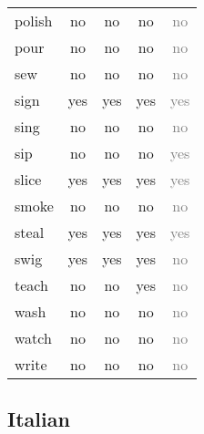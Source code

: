 \begin{longtable}{lc|ccc}
polish    & no       & no     & no          & 	\textcolor{gray}{no}          \\
pour      & no       & no     & no          & 	\textcolor{gray}{no}          \\
sew       & no       & no     & no          & 	\textcolor{gray}{no}          \\
sign      & yes      & yes    & yes         & 	\textcolor{gray}{yes}         \\
sing      & no       & no     & no          & 	\textcolor{gray}{no}          \\
sip       & no       & no     & no          & 	\textcolor{gray}{yes}         \\
slice     & yes      & yes    & yes         & 	\textcolor{gray}{yes}         \\
smoke     & no       & no     & no          & 	\textcolor{gray}{no}          \\
steal     & yes      & yes    & yes         & 	\textcolor{gray}{yes}         \\
swig      & yes      & yes    & yes         & 	\textcolor{gray}{no}          \\
teach     & no       & no     & yes         & 	\textcolor{gray}{no}          \\
wash      & no       & no     & no          & 	\textcolor{gray}{no}          \\
watch     & no       & no     & no          & 	\textcolor{gray}{no}          \\
write     & no       & no     & no          &   \textcolor{gray}{no}         
\end{longtable}


\subsection{Italian}

